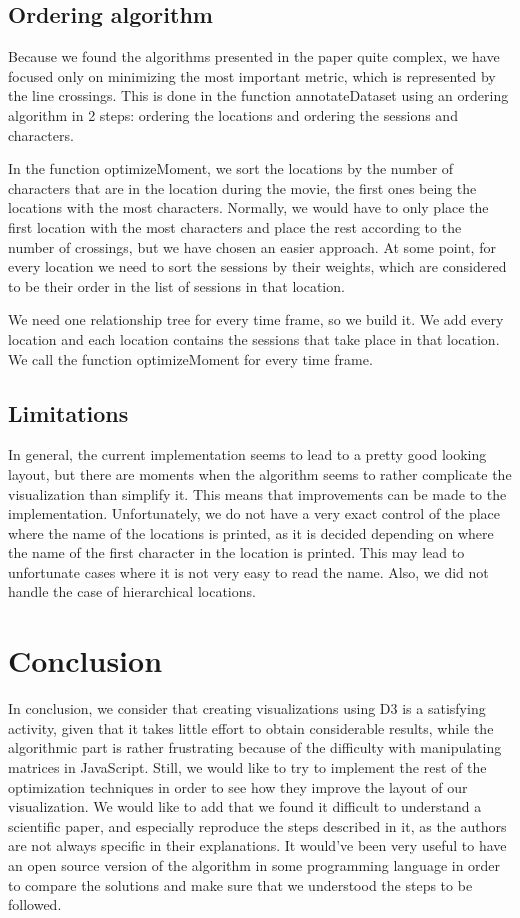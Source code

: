 \documentclass{report}
\begin{document}
\section{Ordering algorithm}
\par
Because we found the algorithms presented in the paper quite complex, we have focused only on minimizing the most important metric, which is represented by the line crossings. This is done in the function annotateDataset using an ordering algorithm in 2 steps: ordering the locations and ordering the sessions and characters.
\par
In the function optimizeMoment, we sort the locations by the number of characters that are in the location during the movie, the first ones being the locations with the most characters. Normally, we would have to only place the first location with the most characters and place the rest according to the number of crossings, but we have chosen an easier approach. At some point, for every location we need to sort the sessions by their weights, which are considered to be their order in the list of sessions in that location.
\par
We need one relationship tree for every time frame, so we build it. We add every location and each location contains the sessions that take place in that location. We call the function optimizeMoment for every time frame.
\par
\section{Limitations}
In general, the current implementation seems to lead to a pretty good looking layout, but there are moments when the algorithm seems to rather complicate the visualization than simplify it. This means that improvements can be made to the implementation. Unfortunately, we do not have a very exact control of the place where the name of the locations is printed, as it is decided depending on where the name of the first character in the location is printed. This may lead to unfortunate cases where it is not very easy to read the name. Also, we did not handle the case of hierarchical locations.

\chapter{Conclusion}
\par
In conclusion, we consider that creating visualizations using D3 is a satisfying activity, given that it takes little effort to obtain considerable results, while the algorithmic part is rather frustrating because of the difficulty with manipulating matrices in JavaScript. Still, we would like to try to implement the rest of the optimization techniques in order to see how they improve the layout of our visualization. We would like to add that we found it difficult to understand a scientific paper, and especially reproduce the steps described in it, as the authors are not always specific in their explanations. It would've been very useful to have an open source version of the algorithm in some programming language in order to compare the solutions and make sure that we understood the steps to be followed.

  

\end{document}
